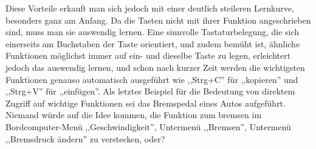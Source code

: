 Diese Vorteile erkauft man sich jedoch mit einer deutlich steileren Lernkurve, besonders ganz am Anfang. Da die Tasten nicht mit ihrer Funktion angeschrieben sind, muss man sie auswendig lernen. Eine sinnvolle Tastaturbelegung, die sich einerseits am Buchstaben der Taste orientiert, und zudem bemüht ist, ähnliche Funktionen möglichst immer auf ein- und dieselbe Taste zu legen, erleichtert jedoch das auswendig lernen, und schon nach kurzer Zeit werden die wichtigsten Funktionen genauso automatisch ausgeführt wie ,,Strg+C'' für ,,kopieren'' und ,,Strg+V'' für ,,einfügen''. Als letztes Beispiel für die Bedeutung von direktem Zugriff auf wichtige Funktionen sei das Bremspedal eines Autos aufgeführt. Niemand würde auf die Idee kommen, die Funktion zum bremsen im Bordcomputer-Menü ,,Geschwindigkeit'', Untermenü ,,Bremsen'', Untermenü ,,Bremsdruck ändern'' zu verstecken, oder?


